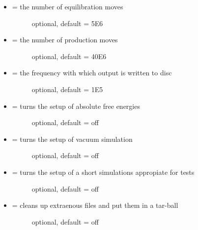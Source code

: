 \documentclass[letterpaper,10pt,english]{sphinxmanual}
\begin{document}
\begin{itemize}
\begin{description}
\end{description}

\item {} \begin{description}
\item[{ = the number of equilibration moves}] \leavevmode
optional, default = 5E6

\end{description}

\item {} \begin{description}
\item[{ = the number of production moves}] \leavevmode
optional, default = 40E6

\end{description}

\item {} \begin{description}
\item[{ = the frequency with which output is written to disc}] \leavevmode
optional, default = 1E5

\end{description}

\item {} \begin{description}
\item[{ = turns  the setup of absolute free energies}] \leavevmode
optional, default = off

\end{description}

\item {} \begin{description}
\item[{ = turns  the setup of vacuum simulation}] \leavevmode
optional, default = off

\end{description}

\item {} \begin{description}
\item[{ = turns  the setup of a short simulations appropiate for tests}] \leavevmode
optional, default = off

\end{description}

\item {} \begin{description}
\item[{ = cleans up extraenous files and put them in a tar-ball}] \leavevmode
optional, default = off

\end{description}

\end{itemize}
\end{document}
